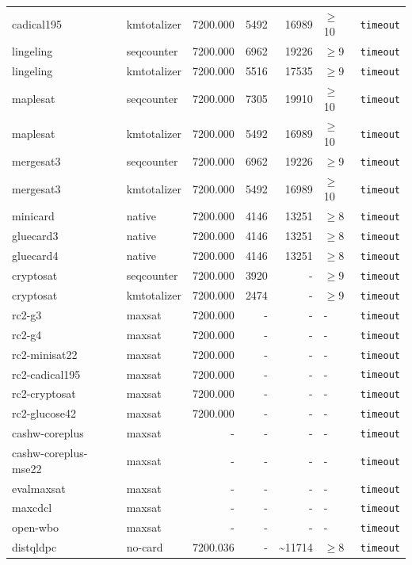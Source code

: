 \begin{longtable}{llrrrl p{}}
cadical195 & kmtotalizer & 7200.000 & 5492 & 16989 & $\geq$10 & \texttt{timeout} \\
lingeling & seqcounter & 7200.000 & 6962 & 19226 & $\geq$9 & \texttt{timeout} \\
lingeling & kmtotalizer & 7200.000 & 5516 & 17535 & $\geq$9 & \texttt{timeout} \\
maplesat & seqcounter & 7200.000 & 7305 & 19910 & $\geq$10 & \texttt{timeout} \\
maplesat & kmtotalizer & 7200.000 & 5492 & 16989 & $\geq$10 & \texttt{timeout} \\
mergesat3 & seqcounter & 7200.000 & 6962 & 19226 & $\geq$9 & \texttt{timeout} \\
mergesat3 & kmtotalizer & 7200.000 & 5492 & 16989 & $\geq$10 & \texttt{timeout} \\
minicard & native & 7200.000 & 4146 & 13251 & $\geq$8 & \texttt{timeout} \\
gluecard3 & native & 7200.000 & 4146 & 13251 & $\geq$8 & \texttt{timeout} \\
gluecard4 & native & 7200.000 & 4146 & 13251 & $\geq$8 & \texttt{timeout} \\
cryptosat & seqcounter & 7200.000 & 3920 & - & $\geq$9 & \texttt{timeout} \\
cryptosat & kmtotalizer & 7200.000 & 2474 & - & $\geq$9 & \texttt{timeout} \\
rc2-g3 & maxsat & 7200.000 & - & - & - & \texttt{timeout} \\
rc2-g4 & maxsat & 7200.000 & - & - & - & \texttt{timeout} \\
rc2-minisat22 & maxsat & 7200.000 & - & - & - & \texttt{timeout} \\
rc2-cadical195 & maxsat & 7200.000 & - & - & - & \texttt{timeout} \\
rc2-cryptosat & maxsat & 7200.000 & - & - & - & \texttt{timeout} \\
rc2-glucose42 & maxsat & 7200.000 & - & - & - & \texttt{timeout} \\
cashw-coreplus & maxsat & - & - & - & - & \texttt{timeout} \\
cashw-coreplus-mse22 & maxsat & - & - & - & - & \texttt{timeout} \\
evalmaxsat & maxsat & - & - & - & - & \texttt{timeout} \\
maxcdcl & maxsat & - & - & - & - & \texttt{timeout} \\
open-wbo & maxsat & - & - & - & - & \texttt{timeout} \\
distqldpc & no-card & 7200.036 & - & \textasciitilde{}11714 & $\geq$8 & \texttt{timeout} \\

\end{longtable}
